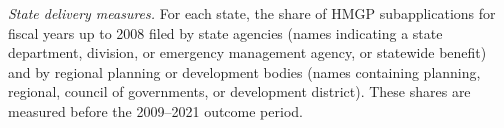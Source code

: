 \textit{State delivery measures.} For each state, the share of HMGP subapplications for fiscal years up to 2008 filed by state agencies (names indicating a state department, division, or emergency management agency, or statewide benefit) and by regional planning or development bodies (names containing planning, regional, council of governments, or development district). These shares are measured before the 2009--2021 outcome period.
